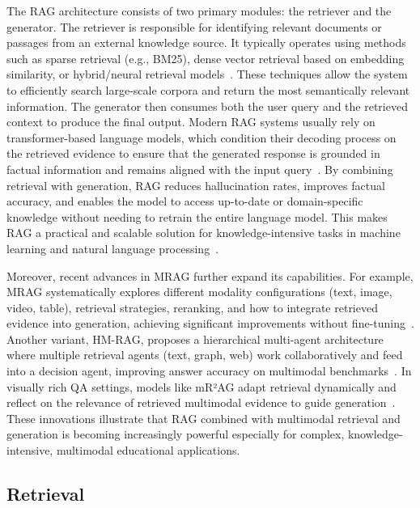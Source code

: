 The RAG architecture consists of two primary modules: the retriever and the generator. The retriever is responsible for identifying relevant documents or passages from an external knowledge source. It typically operates using methods such as sparse retrieval (e.g., BM25), dense vector retrieval based on embedding similarity, or hybrid/neural retrieval models~\cite{lewis2020rag, luan2021sparse_dense}. These techniques allow the system to efficiently search large-scale corpora and return the most semantically relevant information. The generator then consumes both the user query and the retrieved context to produce the final output. Modern RAG systems usually rely on transformer-based language models, which condition their decoding process on the retrieved evidence to ensure that the generated response is grounded in factual information and remains aligned with the input query~\cite{izacard2022rag_sequence}. By combining retrieval with generation, RAG reduces hallucination rates, improves factual accuracy, and enables the model to access up-to-date or domain-specific knowledge without needing to retrain the entire language model. This makes RAG a practical and scalable solution for knowledge-intensive tasks in machine learning and natural language processing~\cite{izacard2021leveraging, gao2023rag_survey}.

Moreover, recent advances in MRAG further expand its capabilities. For example, MRAG systematically explores different modality configurations (text, image, video, table), retrieval strategies, reranking, and how to integrate retrieved evidence into generation, achieving significant improvements without fine-tuning~\cite{hu2025mrag}. Another variant, HM-RAG, proposes a hierarchical multi-agent architecture where multiple retrieval agents (text, graph, web) work collaboratively and feed into a decision agent, improving answer accuracy on multimodal benchmarks~\cite{liu2025hmrag}. In visually rich QA settings, models like mR²AG adapt retrieval dynamically and reflect on the relevance of retrieved multimodal evidence to guide generation~\cite{zhang2024mr2ag}. These innovations illustrate that RAG combined with multimodal retrieval and generation is becoming increasingly powerful   especially for complex, knowledge-intensive, multimodal educational applications.

\subsection{Retrieval}

